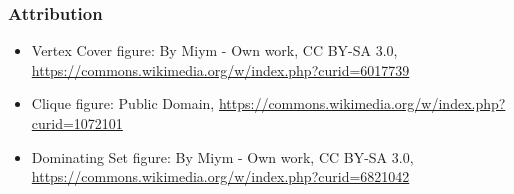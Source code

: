 \documentclass[12pt,aspectratio=169]{beamer}
\begin{document}
\begin{frame}\frametitle{Attribution}
\small
  \begin{itemize}[<.->]
  \item
    Vertex Cover figure: By Miym - Own work, CC BY-SA 3.0,
    \url{https://commons.wikimedia.org/w/index.php?curid=6017739}
  \item
    Clique figure: Public Domain,
    \url{https://commons.wikimedia.org/w/index.php?curid=1072101}
  \item
    Dominating Set figure: By Miym - Own work, CC BY-SA 3.0, \url{https://commons.wikimedia.org/w/index.php?curid=6821042}
  \end{itemize}
\end{frame}
\end{document}
